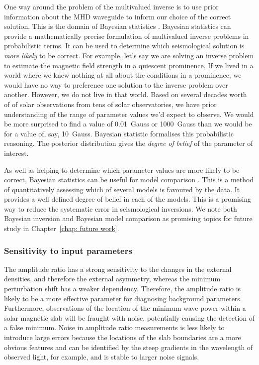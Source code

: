 \documentclass[12pt]{../style-files/ociamthesis}
\begin{document}
One way around the problem of the multivalued inverse is to use prior information about the MHD waveguide to inform our choice of the correct solution. This is the domain of Bayesian statistics \citep{arr_etal11,arr_etal18}. Bayesian statistics can provide a mathematically precise formulation of multivalued inverse problems in probabilistic terms. It can be used to determine which seismological solution is \textit{more likely} to be correct. For example, let's say we are solving an inverse problem to estimate the magnetic field strength in a quiescent prominence. If we lived in a world where we knew nothing at all about the conditions in a prominence, we would have no way to preference one solution to the inverse problem over another. However, we do not live in that world. Based on several decades worth of of solar observations from tens of solar observatories, we have prior understanding of the range of parameter values we'd expect to observe. We would be more surprised to find a value of 0.01~Gauss or 1000~Gauss than we would be for a value of, say, 10~Gauss. Bayesian statistic formalises this probabilistic reasoning. The posterior distribution gives the \textit{degree of belief} of the parameter of interest.

As well as helping to determine which parameter values are more likely to be correct, Bayesian statistics can be useful for model comparison \citep{arr_etal18}. This is a method of quantitatively assessing which of several models is favoured by the data. It provides a well defined degree of belief in each of the models. This is a promising way to reduce the systematic error in seismological inversions. We note both Bayesian inversion and Bayesian model comparison as promising topics for future study in Chapter~\ref{chap: future work}.


\subsubsection{Sensitivity to input parameters}

The amplitude ratio has a strong sensitivity to the changes in the external densities, and therefore the external asymmetry, whereas the minimum perturbation shift has a weaker dependency. Therefore, the amplitude ratio is likely to be a more effective parameter for diagnosing background parameters. Furthermore, observations of the location of the minimum wave power within a solar magnetic slab will be fraught with noise, potentially causing the detection of a false minimum. Noise in amplitude ratio measurements is less likely to introduce large errors because the locations of the slab boundaries are a more obvious features and can be identified by the steep gradients in the wavelength of observed light, for example, and is stable to larger noise signals.
\end{document}
